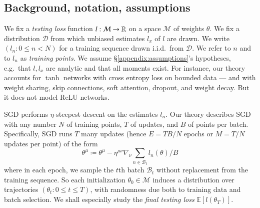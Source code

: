 \documentclass[final,12pt]{colt2021} %
\newcommand{\expc}{\mathbb{E}}
\newcommand{\Bb}{\mathcal{B}}
\newcommand{\Dd}{\mathcal{D}}
\newcommand{\Mm}{\mathcal{M}}
\begin{document}
        \newpage
        \subsection{Background, notation, assumptions}

    
            We fix a \emph{testing loss} function $l:\Mm\to\RR$ on a space
            $\Mm$ of weights $\theta$.  We fix a distribution $\Dd$ from which
            unbiased estimates $l_x$ of $l$ are drawn.  We write $(l_n:
            0\leq n<N)$ for a training sequence drawn i.i.d.\ from $\Dd$.  We
            refer to $n$ and to $l_n$ as \emph{training points}.  We assume
            \S\ref{appendix:assumptions}'s hypotheses, e.g.\ that $l, l_x$ are
            analytic and that all moments exist.
            For instance, our theory accounts for $\tanh$ networks with cross
            entropy loss on bounded data --- and with weight sharing, skip
            connections, soft attention, dropout, and weight decay.  But it
            does not model $\text{ReLU}$ networks.


            SGD performs $\eta$-steepest descent on the estimates $l_n$.  Our
            theory describes SGD with any number
                 $N$ of training points,
                 $T$ of updates, and 
                 $B$ of points per batch.
            Specifically, SGD runs $T$ many updates (hence $E=TB/N$ epochs or
            $M=T/N$ updates per point) of the form
            $$
                \textstyle
                \theta^\mu
                \coloneqq
                \theta^\mu -
                \eta^{\mu\nu} \nabla_\nu
                    \sum_{n\in \Bb_t} l_n(\theta) / B
            $$
            where in each epoch, we sample the $t$th batch $\Bb_t$ without
            replacement from the training sequence.  So each initialization
            $\theta_0 \in \Mm$ induces a distribution over
            trajectories $(\theta_t: 0\leq t \leq T)$, with randomness due both
            to training data and batch selection.  We shall especially study
            the \emph{final testing loss} $\expc[l(\theta_T)]$.

\end{document}
